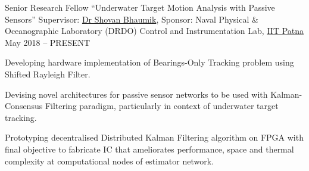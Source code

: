
\begin{cvexperience}

\cvposition
	{Senior Research Fellow} %
	{``Underwater Target Motion Analysis with Passive Sensors''} %
	{Supervisor: \href{http://www.tutorialpoint.org/ShovanBhaumik/index.html}{Dr Shovan Bhaumik}, Sponsor: Naval Physical \& Oceanographic Laboratory (DRDO)} %
	{Control and Instrumentation Lab, \href{https://www.iitp.ac.in}{IIT Patna}} %
	{May 2018 -- PRESENT} %
	{\begin{cvitems} %
		\item {Developing hardware implementation of Bearings-Only Tracking problem using Shifted Rayleigh Filter.}
		\item {Devising novel architectures for passive sensor networks to be used with Kalman-Consensus Filtering paradigm, particularly in context of underwater target tracking.}
		\item {Prototyping decentralised Distributed Kalman Filtering algorithm on FPGA with final objective to fabricate IC that ameliorates performance, space and thermal complexity at computational nodes of estimator network.}
	\end{cvitems}}


\end{cvexperience}
